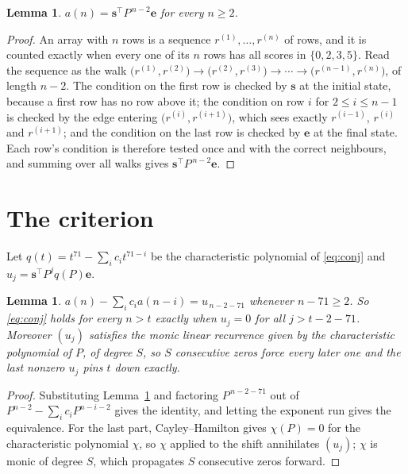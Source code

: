 \documentclass[11pt,a4paper]{article}
\theoremstyle{plain}
\newtheorem{lemma}[theorem]{Lemma}
\theoremstyle{definition}
\begin{document}
\begin{lemma}\label{lem:walk}
$a(n)=\mathbf{s}^{\!\top}P^{\,n-2}\mathbf{e}$ for every $n\ge2$.
\end{lemma}

\begin{proof}
An array with $n$ rows is a sequence $r^{(1)},\dots,r^{(n)}$ of rows, and it is counted
exactly when every one of its $n$ rows has all scores in $\{0,2,3,5\}$. Read the sequence as the
walk $\bigl(r^{(1)},r^{(2)}\bigr)\to\bigl(r^{(2)},r^{(3)}\bigr)\to\cdots\to
\bigl(r^{(n-1)},r^{(n)}\bigr)$, of length $n-2$. The condition on the first row is
checked by $\mathbf{s}$ at the initial state, because a first row has no row above it; the
condition on row $i$ for $2\le i\le n-1$ is checked by the edge entering
$\bigl(r^{(i)},r^{(i+1)}\bigr)$, which sees exactly $r^{(i-1)}$, $r^{(i)}$ and
$r^{(i+1)}$; and the condition on the last row is checked by $\mathbf{e}$ at the final
state. Each row's condition is therefore tested once and with the correct neighbours, and
summing over all walks gives $\mathbf{s}^{\!\top}P^{\,n-2}\mathbf{e}$.
\end{proof}

\section{The criterion}

Let $q(t)=t^{71}-\sum_i c_i t^{71-i}$ be the characteristic polynomial of
\eqref{eq:conj} and $u_j=\mathbf{s}^{\!\top}P^{j}q(P)\mathbf{e}$.

\begin{lemma}\label{lem:crit}
$a(n)-\sum_i c_i a(n-i)=u_{\,n-2-71}$ whenever $n-71\ge2$. So \eqref{eq:conj}
holds for every $n>t$ exactly when $u_j=0$ for all $j>t-2-71$. Moreover $(u_j)$
satisfies the monic linear recurrence given by the characteristic polynomial of $P$, of
degree $S$, so $S$ consecutive zeros force every later one and the last nonzero $u_j$ pins
$t$ down exactly.
\end{lemma}

\begin{proof}
Substituting Lemma~\ref{lem:walk} and factoring $P^{\,n-2-71}$ out of
$P^{n-2}-\sum_i c_i P^{n-i-2}$ gives the identity, and letting the exponent run gives the
equivalence. For the last part, Cayley--Hamilton gives $\chi(P)=0$ for the characteristic
polynomial $\chi$, so $\chi$ applied to the shift annihilates $(u_j)$; $\chi$ is monic of
degree $S$, which propagates $S$ consecutive zeros forward.
\end{proof}
\end{document}
